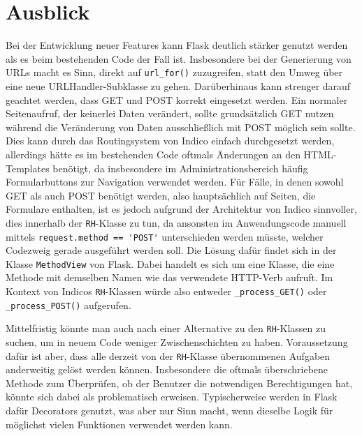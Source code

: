 \section{Ausblick}

Bei der Entwicklung neuer Features kann Flask deutlich stärker genutzt werden als es beim
bestehenden Code der Fall ist. Insbesondere bei der Generierung von URLs macht es Sinn, direkt auf
\lstinline{url_for()} zuzugreifen, statt den Umweg über eine neue URLHandler-Subklasse zu gehen.
Darüberhinaus kann strenger darauf geachtet werden, dass GET und POST korrekt eingesetzt werden.
Ein normaler Seitenaufruf, der keinerlei Daten verändert, sollte grundsätzlich GET nutzen während
die Veränderung von Daten ausschließlich mit POST möglich sein sollte. Dies kann durch das
Routingsystem von Indico einfach durchgesetzt werden, allerdings hätte es im bestehenden Code
oftmals Änderungen an den HTML-Templates benötigt, da insbesondere im Administrationsbereich häufig
Formularbuttons zur Navigation verwendet werden. Für Fälle, in denen sowohl GET als auch POST
benötigt werden, also hauptsächlich auf Seiten, die Formulare enthalten, ist es jedoch aufgrund
der Architektur von Indico sinnvoller, dies innerhalb der \lstinline{RH}-Klasse zu tun, da ansonsten
im Anwendungscode manuell mittels \lstinline{request.method == 'POST'} unterschieden werden müsste,
welcher Codezweig gerade ausgeführt werden soll. Die Lösung dafür findet sich in der Klasse
\lstinline{MethodView} von Flask. Dabei handelt es sich um eine Klasse, die eine Methode mit
demselben Namen wie das verwendete HTTP-Verb aufruft. Im Kontext von Indicos \lstinline{RH}-Klassen
würde also entweder \lstinline{_process_GET()} oder \lstinline{_process_POST()} aufgerufen.

Mittelfristig könnte man auch nach einer Alternative zu den \lstinline{RH}-Klassen zu suchen, um in
neuem Code weniger Zwischenschichten zu haben. Voraussetzung dafür ist aber, dass alle derzeit von
der \lstinline{RH}-Klasse übernommenen Aufgaben anderweitig gelöst werden können. Insbesondere die
oftmals überschriebene Methode zum Überprüfen, ob der Benutzer die notwendigen Berechtigungen hat,
könnte sich dabei als problematisch erweisen. Typischerweise werden in Flask dafür Decorators
genutzt, was aber nur Sinn macht, wenn dieselbe Logik für möglichst vielen Funktionen verwendet
werden kann.
